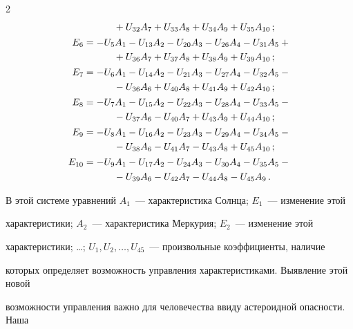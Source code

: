 \begin{multicols}{2}
\begin{align*}
     &\hspace*{11mm}{}+U_{32}A_7  +U_{33}A_8+U_{34}A_9+U_{35}A_{10}\,;\\[1pt]


     E_6 &=-U_5A_1-U_{13}A_2-U_{20}A_3-U_{26}A_4-U_{31}A_5+{}\\


     &\hspace*{11mm}{}+U_{36}A_7+U_{37}A_8+U_{38}A_9+U_{39}A_{10}\,;\\[1pt]


     E_7 &=-U_6A_1-U_{14}A_2-U_{21}A_3-U_{27}A_4-U_{32}A_5-{}\\


&\hspace*{11mm}{}- U_{36}A_6+U_{40}A_8+U_{41}A_9+U_{42}A_{10}\,;\\[1pt]


     E_8 &=-U_7A_1 -U_{15}A_2-U_{22}A_3-U_{28}A_4-U_{33}A_5-{}\\


&\hspace*{11mm}{}-U_{37}A_6-U_{40}A_7+U_{43}A_9+U_{44}A_{10}\,;\\[1pt]


     E_9  &= -U_8A_1-U_{16}A_2-U_{23}A_3-U_{29}A_4-U_{34}A_5-{}\\


&\hspace*{11mm}{}-U_{38}A_6-U_{41}A_7-U_{43}A_8+U_{45}A_{10}\,;\\[1pt]


     E_{10}&= -U_9A_1-U_{17}A_2-U_{24}A_3-U_{30}A_4-U_{35}A_5-{}\\


&\hspace*{11mm}{}-U_{39}A_6-U_{42}A_7-U_{44}A_8-U_{45}A_9\,.


     \end{align*}





В этой системе уравнений $A_1$~--- характеристика Солнца; $E_1$~--- изменение этой 


характеристики; $A_2$~--- характеристика Меркурия; $E_2$~--- изменение этой 


характеристики; \ldots ; $U_1, U_2, \ldots , U_{45}$~--- про\-извольные коэффициенты, наличие 


которых определя\-ет возможность управ\-ле\-ния характеристиками. Выявление этой новой 


возможности управ\-ле\-ния важно для человечества ввиду астероидной опасности. Наша 



\end{multicols}
